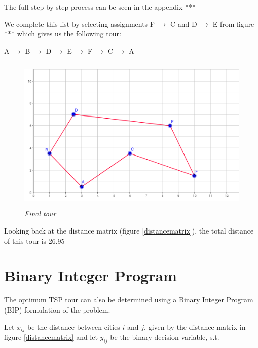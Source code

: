 \vspace{3mm}

The full step-by-step process can be seen in the appendix *** %

\vspace{5mm}

We complete this list by selecting assignments F $\rightarrow$ C and D $\rightarrow$ E from figure *** %
which gives us the following tour:

\vspace{2mm}

A $\rightarrow$ B $\rightarrow$ D $\rightarrow$ E $\rightarrow$ F $\rightarrow$ C $\rightarrow$ A


\begin{figure}[ht] 
	\centering
	\vspace{-9mm}
	\includegraphics[height=7.5cm]{6citytour}
	\caption{\textsl{Final tour}}
	\label{6citytour}
\end{figure}

Looking back at the distance matrix (figure \ref{distancematrix}), the total distance of this tour is 26.95




\section{Binary Integer Program}

The optimum TSP tour can also be determined using a Binary Integer Program (BIP) formulation of the problem.

\vspace{5mm}

Let $x_{ij}$ be the distance between cities $i$ and $j$, given by the distance matrix in figure \ref{distancematrix} and let $y_{ij}$ be the binary decision variable, s.t.

